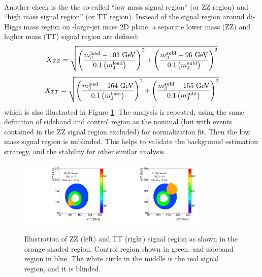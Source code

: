 \paragraph{}
Another check is the the so-called ``low mass signal region'' (or ZZ region) and ``high mass signal region'' (or TT region). 
Instead of the signal region around di-Higgs mass region on \mleadJ-\msublJ large-\R jet mass 2D plane, a separate lower mass (ZZ) and higher mass (TT) signal region are defined: 
\begin{equation}
X_{ZZ} = \sqrt{\left(\frac{m^{\rm lead}_{\rm J} - \text{103 GeV}}{0.1 \left(m^{\rm lead}_{\rm J}\right)}\right)^2 + \left(\frac{m^{\rm subl}_{\rm J}- \text{96 GeV}}{0.1 \left(m^{\rm subl}_{\rm J}\right)}\right)^2}
\label{eq:boosted_Xzz}
\end{equation}
\begin{equation}
X_{TT} = \sqrt{\left(\frac{m^{\rm lead}_{\rm J} - \text{164 GeV}}{0.1 \left(m^{\rm lead}_{\rm J}\right)}\right)^2 + \left(\frac{m^{\rm subl}_{\rm J}- \text{155 GeV}}{0.1 \left(m^{\rm subl}_{\rm J}\right)}\right)^2}
\label{eq:boosted_Xtt}
\end{equation}
which is also illustrated in Figure \ref{CRSB:ZZIllustration}. 
The analysis is repeated, using the same definition of sideband and control region as the nominal (but with events contained in the ZZ signal region excluded) for normalization fit. 
Then the low mass signal region is unblinded. 
This helps to validate the background estimation strategy, and the stability for other similar analysis.

\begin{figure}[htbp!]
\begin{center}
\includegraphics[width=0.4\textwidth,angle=-90]{figures/boosted/ZZ/Compare_NoTag_mH0H1.pdf}
\includegraphics[width=0.4\textwidth,angle=-90]{figures/boosted/TT/Compare_NoTag_mH0H1.pdf}
\end{center}
\caption{Illustration of ZZ (left) and TT (right) signal region as shown in the orange shaded region. Control region shown in green, and sideband region in blue. The white circle in the middle is the real signal region, and it is blinded.}
\label{CRSB:ZZIllustration}
\end{figure}

